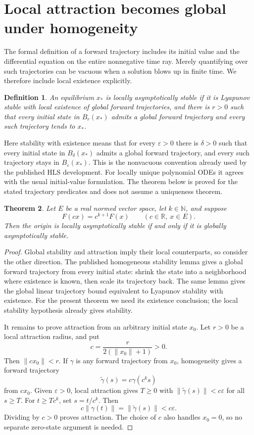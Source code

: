 \documentclass[11pt]{article}
\newtheorem{theorem}{Theorem}[section]
\newtheorem{definition}[theorem]{Definition}
\newcommand{\R}{\mathbb R}
\newcommand{\N}{\mathbb N}
\begin{document}
\section{Local attraction becomes global under homogeneity}

The formal definition of a forward trajectory includes its initial value
and the differential equation on the entire nonnegative time ray. Merely
quantifying over such trajectories can be vacuous when a solution blows up
in finite time. We therefore include local existence explicitly.

\begin{definition}
An equilibrium $x_*$ is locally asymptotically stable if it is Lyapunov
stable with local existence of global forward trajectories, and there is
$r>0$ such that every initial state in $B_r(x_*)$ admits a global forward
trajectory and every such trajectory tends to $x_*$.
\end{definition}

Here stability with existence means that for every $\varepsilon>0$ there
is $\delta>0$ such that every initial state in $B_\delta(x_*)$ admits a
global forward trajectory, and every such trajectory stays in
$B_\varepsilon(x_*)$. This is the nonvacuous convention already used by
the published HLS development. For locally unique polynomial ODEs it agrees
with the usual initial-value formulation. The theorem below is proved for
the stated trajectory predicates and does not assume a uniqueness theorem.

\begin{theorem}\label{thm:lasgas}
Let $E$ be a real normed vector space, let $k\in\N$, and suppose
\[
 F(cx)=c^{k+1}F(x)\qquad(c\in\R,\ x\in E).
\]
Then the origin is locally asymptotically stable if and only if it is
globally asymptotically stable.
\end{theorem}

\begin{proof}
Global stability and attraction imply their local counterparts, so consider
the other direction. The published homogeneous stability lemma gives a
global forward trajectory from every initial state: shrink the state into
a neighborhood where existence is known, then scale its trajectory back.
The same lemma gives the global linear trajectory bound equivalent to
Lyapunov stability with existence. For the present theorem we need its
existence conclusion; the local stability hypothesis already gives stability.

It remains to prove attraction from an arbitrary initial state $x_0$.
Let $r>0$ be a local attraction radius, and put
\[
 c=\frac{r}{2(\lVert x_0\rVert+1)}>0.
\]
Then $\lVert cx_0\rVert<r$. If $\gamma$ is any forward trajectory from
$x_0$, homogeneity gives a forward trajectory
\[
 \widetilde\gamma(s)=c\gamma(c^ks)
\]
from $cx_0$. Given $\varepsilon>0$, local attraction gives $T\ge0$ with
$\lVert\widetilde\gamma(s)\rVert<c\varepsilon$ for all $s\ge T$.
For $t\ge Tc^k$, set $s=t/c^k$. Then
\[
 c\lVert\gamma(t)\rVert=\lVert\widetilde\gamma(s)\rVert
 <c\varepsilon.
\]
Dividing by $c>0$ proves attraction. The choice of $c$ also handles
$x_0=0$, so no separate zero-state argument is needed.
\end{proof}
\end{document}
